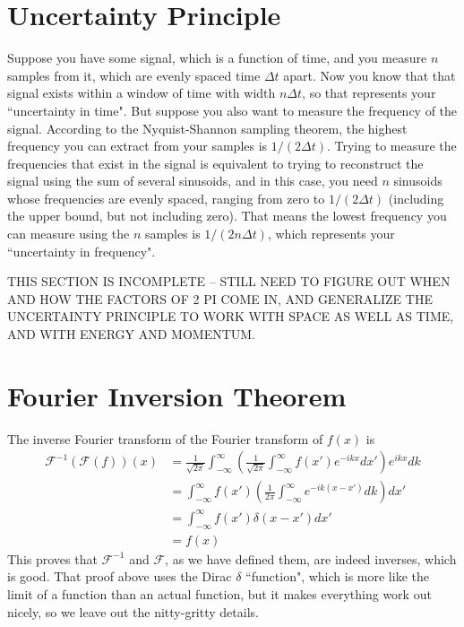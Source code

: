 \documentclass[12pt]{article}
\begin{document}
\section{Uncertainty Principle}
Suppose you have some signal, which is a function of time, and you measure $n$ samples from it, which are evenly spaced time $\Delta t$ apart. Now you know that that signal exists within a window of time with width $n \Delta t$, so that represents your ``uncertainty in time". But suppose you also want to measure the frequency of the signal. According to the Nyquist-Shannon sampling theorem, the highest frequency you can extract from your samples is $1/(2 \Delta t)$. Trying to measure the frequencies that exist in the signal is equivalent to trying to reconstruct the signal using the sum of several sinusoids, and in this case, you need $n$ sinusoids whose frequencies are evenly spaced, ranging from zero to $1/(2\Delta t)$ (including the upper bound, but not including zero). That means the lowest frequency you can measure using the $n$ samples is $1/(2n\Delta t)$, which represents your ``uncertainty in frequency".

THIS SECTION IS INCOMPLETE -- STILL NEED TO FIGURE OUT WHEN AND HOW THE FACTORS OF 2 PI COME IN, AND GENERALIZE THE UNCERTAINTY PRINCIPLE TO WORK WITH SPACE AS WELL AS TIME, AND WITH ENERGY AND MOMENTUM.

\section{Fourier Inversion Theorem}
The inverse Fourier transform of the Fourier transform of $f(x)$ is
\begin{align*}
    \mathcal{F}^{-1}(\mathcal{F}(f))(x) &= \frac{1}{\sqrt{2 \pi}} \int_{-\infty}^\infty \left( \frac{1}{\sqrt{2 \pi}} \int_{-\infty}^\infty f(x') e^{-ikx} dx' \right) e^{ikx} dk \\
    &= \int_{-\infty}^\infty f(x') \left( \frac{1}{2 \pi} \int_{-\infty}^\infty e^{-ik(x - x')} dk \right) dx' \\
    &= \int_{-\infty}^\infty f(x') \delta(x - x') dx' \\
    &= f(x)
\end{align*}
This proves that $\mathcal{F}^{-1}$ and $\mathcal{F}$, as we have defined them, are indeed inverses, which is good. That proof above uses the Dirac $\delta$ ``function", which is more like the limit of a function than an actual function, but it makes everything work out nicely, so we leave out the nitty-gritty details.
\end{document}
